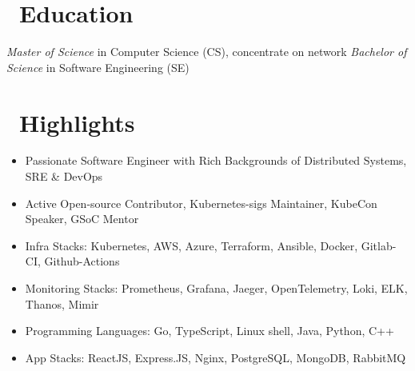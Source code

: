 \documentclass{resume}
\begin{document}



\section{\faGraduationCap\ Education}
\textit{Master of Science} in Computer Science (CS), concentrate on network
\textit{Bachelor of Science} in Software Engineering (SE)

\section{\faCogs\ Highlights}
\begin{itemize}[parsep=0.5ex]
  \item Passionate Software Engineer with Rich Backgrounds of Distributed Systems, SRE \& DevOps
  \item Active Open-source Contributor, Kubernetes-sigs Maintainer, KubeCon Speaker, GSoC Mentor
  \item Infra Stacks: Kubernetes, AWS, Azure, Terraform, Ansible, Docker, Gitlab-CI, Github-Actions
  \item Monitoring Stacks: Prometheus, Grafana, Jaeger, OpenTelemetry, Loki, ELK, Thanos, Mimir
  \item Programming Languages: Go, TypeScript, Linux shell, Java, Python, C++
  \item App Stacks: ReactJS, Express.JS, Nginx, PostgreSQL, MongoDB, RabbitMQ
\end{itemize}
\end{document}
